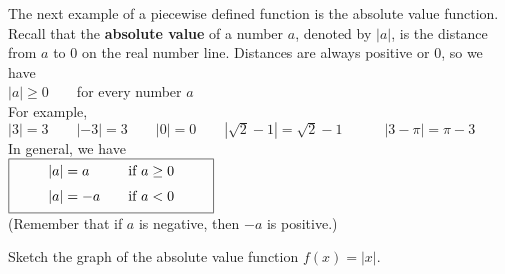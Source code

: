 \documentclass{sebase}
\begin{document}
The next
example of a piecewise defined function is the absolute value function.
Recall that the \textbf{absolute value} of a number $a$, denoted by $%
\left\vert a\right\vert $, is the distance from $a$ to $0$ on the real
number line. Distances are always positive or $0$, so we have\\[6pt]
\hspace*{\fill}$\left\vert a\right\vert \geq 0\qquad $for every number $a$%
\hspace*{\fill}\\[6pt]
For example, \\[6pt]
\hspace*{\fill}$\left\vert 3\right\vert =3\qquad \left\vert -3\right\vert
=3\qquad \left\vert 0\right\vert =0\qquad \left\vert \sqrt{2}-1\right\vert =%
\sqrt{2}-1\qquad \quad \left\vert 3-\pi \right\vert =\pi -3$\hspace*{\fill}\\%
[6pt]
In general, we have \\[6pt]
\hspace*{\fill}$\fbox{$\qquad 
\begin{array}{lc}
\left\vert a\right\vert =a & \text{\quad if }a\geq 0\vspace{6pt} \\ 
\left\vert a\right\vert =-a & \text{\quad if }a<0\vspace{2pt}%
\end{array}%
\qquad $}$\hspace*{\fill}\\[6pt]
(Remember that if $a$ is
negative, then $-a$ is positive.)\vspace*{6pt}

\begin{Example}[8]
%
Sketch the graph of the absolute value function $f(x)=\left| x \right| $.
\end{Example}
\end{document}
